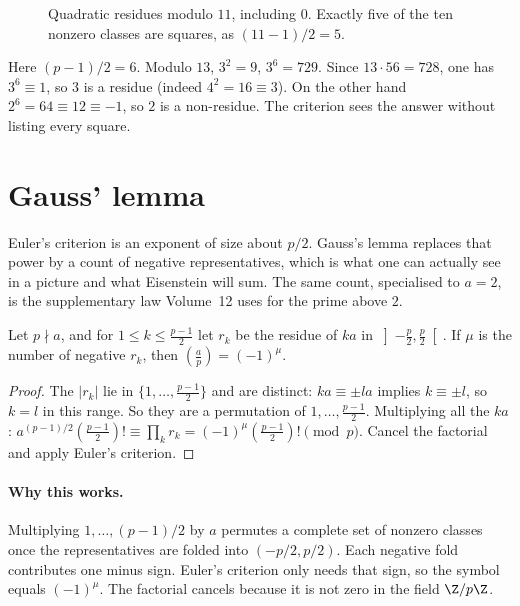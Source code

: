 \begin{figure}[ht]
\centering
{}
\caption{Quadratic residues modulo $11$, including $0$. Exactly five of the ten nonzero classes are squares, as $(11-1)/2=5$.}
\label{fig:t1-residues}
\end{figure}

\begin{examplex}[Euler's criterion for $p=13$]
Here $(p-1)/2=6$. Modulo $13$, $3^2=9$, $3^6=729$. Since $13\cdot 56=728$, one has $3^6\equiv 1$, so $3$ is a residue (indeed $4^2=16\equiv 3$). On the other hand $2^6=64\equiv 12\equiv -1$, so $2$ is a non-residue. The criterion sees the answer without listing every square.
\end{examplex}

\section{Gauss' lemma}

Euler's criterion is an exponent of size about $p/2$. Gauss's lemma replaces that power by a count of negative representatives, which is what one can actually see in a picture and what Eisenstein will sum. The same count, specialised to $a=2$, is the supplementary law Volume~12 uses for the prime above $2$.

\begin{theorem}\label{thm:gausslemma}
Let $p\nmid a$, and for $1\le k\le\frac{p-1}2$ let $r_k$ be the residue of $ka$ in $\left]-\frac p2,\frac p2\right[$. If $\mu$ is the number of negative $r_k$, then $\left(\frac ap\right)=(-1)^\mu$.
\end{theorem}
\begin{proof}
The $|r_k|$ lie in $\{1,\dots,\frac{p-1}2\}$ and are distinct: $ka\equiv\pm la$ implies $k\equiv\pm l$, so $k=l$ in this range. So they are a permutation of $1,\dots,\frac{p-1}2$. Multiplying all the $ka$:
$a^{(p-1)/2}\left(\frac{p-1}2\right)!\equiv\prod_kr_k=(-1)^\mu\left(\frac{p-1}2\right)!\pmod p$. Cancel the factorial and apply Euler's criterion.
\end{proof}

\paragraph{Why this works.}
Multiplying $1,\ldots,(p-1)/2$ by $a$ permutes a complete set of nonzero classes once the representatives are folded into $(-p/2,p/2)$. Each negative fold contributes one minus sign. Euler's criterion only needs that sign, so the symbol equals $(-1)^\mu$. The factorial cancels because it is not zero in the field $\Z/p\Z$.

